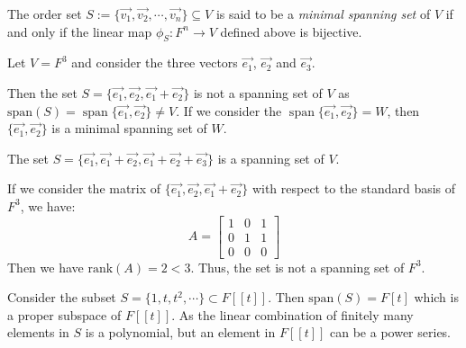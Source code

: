 \documentclass[
	11pt, %
	fleqn, %
	a4paper, %
]{LegrandOrangeBook}
\renewcommand{\span}[1]{\text{span}(#1)} %
\DeclareMathOperator{\Span}{span}
\begin{document}
\begin{proposition}
    The order set $S := \{\vec{v_1}, \vec{v_2}, \cdots, \vec{v_n}\} \subseteq V$ is said to be a \emph{minimal spanning set} of $V$ if and only if the linear map $\phi_S: F^n \to V$ defined above is bijective.
\end{proposition}

\begin{example}
    Let $V = F^3$ and consider the three vectors $\vec{e_1}$, $\vec{e_2}$ and $\vec{e_3}$. 
    
    Then the set $S = \{\vec{e_1}, \vec{e_2}, \vec{e_1} + \vec{e_2}\}$ is not a spanning set of $V$ as $\span{S} = \Span \{\vec{e_1}, \vec{e_2}\} \neq V$. If we consider the $\Span \{\vec{e_1}, \vec{e_2}\} = W$, then $\{\vec{e_1}, \vec{e_2}\}$ is a minimal spanning set of $W$.

    The set $S = \{\vec{e_1}, \vec{e_1} + \vec{e_2}, \vec{e_1} + \vec{e_2} + \vec{e_3}\}$ is a spanning set of $V$.
\end{example}

\begin{remark}
    If we consider the matrix of $\{\vec{e_1}, \vec{e_2}, \vec{e_1} + \vec{e_2}\}$ with respect to the standard basis of $F^3$, we have:
    \[
        A = \begin{bmatrix}
            1 & 0 & 1 \\
            0 & 1 & 1 \\
            0 & 0 & 0
        \end{bmatrix}
    \]
    Then we have $\text{rank}(A) = 2 < 3$. Thus, the set is not a spanning set of $F^3$.
\end{remark}

\begin{example}
    Consider the subset $S = \{ 1, t, t^2, \cdots \} \subset F[[t]]$. Then $\span{S} = F[t]$ which is a proper subspace of $F[[t]]$. As the linear combination of finitely many elements in $S$ is a polynomial, but an element in $F[[t]]$ can be a power series.
\end{example}
\end{document}
